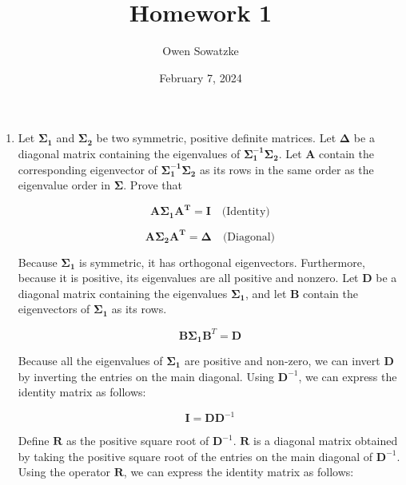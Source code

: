 \documentclass[fleqn]{article}
\title{Homework 1}
\author{Owen Sowatzke}
\date{February 7, 2024}
\newcommand{\zerodisplayskip}{
	\setlength{\abovedisplayskip}{0pt}%
	\setlength{\belowdisplayskip}{0pt}%
	\setlength{\abovedisplayshortskip}{0pt}%
	\setlength{\belowdisplayshortskip}{0pt}%
	\setlength{\mathindent}{0pt}}
\begin{document}
	\offinterlineskip
	\setlength{\lineskip}{12pt}
	\zerodisplayskip
	\maketitle
	
	\begin{enumerate}
		\item Let $\mathbf{\Sigma_1}$ and $\mathbf{\Sigma_2}$ be two symmetric, positive definite matrices. Let $\mathbf{\Delta}$ be a diagonal matrix containing the eigenvalues of $\mathbf{\Sigma_1^{-1}}\mathbf{\Sigma_2}$. Let $\mathbf{A}$ contain the corresponding eigenvector of $\mathbf{\Sigma_1^{-1}}\mathbf{\Sigma_2}$ as its rows in the same order as the eigenvalue order in $\mathbf{\Sigma}$. Prove that
		
		\begin{equation*}
			\mathbf{A\Sigma_1A^T} = \mathbf{I}\quad\text{(Identity)}
		\end{equation*}
		
		\begin{equation*}
			\mathbf{A\Sigma_2A^T} = \mathbf{\Delta}\quad\text{(Diagonal)}
		\end{equation*}
		
		Because $\mathbf{\Sigma_1}$ is symmetric, it has orthogonal eigenvectors. Furthermore, because it is positive, its eigenvalues are all positive and nonzero. Let $\mathbf{D}$ be a diagonal matrix containing the eigenvalues $\mathbf{\Sigma_1}$, and let $\mathbf{B}$ contain the eigenvectors of $\mathbf{\Sigma_1}$ as its rows.
		
		\begin{equation*}
			\mathbf{B}\mathbf{\Sigma_1}\mathbf{B}^T = \mathbf{D} 
		\end{equation*}
		
		Because all the eigenvalues of $\mathbf{\Sigma_1}$ are positive and non-zero, we can invert $\mathbf{D}$ by inverting the entries on the main diagonal. Using $\mathbf{D}^{-1}$, we can express the identity matrix as follows:
		
		\begin{equation*}
			\mathbf{I} = \mathbf{D}\mathbf{D}^{-1}
		\end{equation*}
		
		Define $\mathbf{R}$ as the positive square root of $\mathbf{D}^{-1}$. $\mathbf{R}$ is a diagonal matrix obtained by taking the positive square root of the entries on the main diagonal of $\mathbf{D}^{-1}$. Using the operator $\mathbf{R}$, we can express the identity matrix as follows:
		

\end{enumerate}
\end{document}

